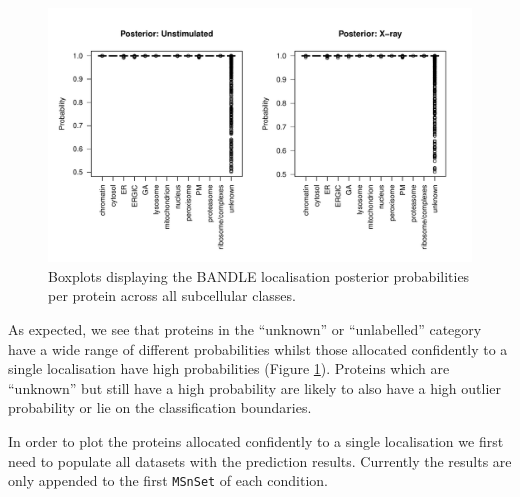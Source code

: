 \documentclass[9pt,a4paper,]{extarticle}
\begin{document}
\begin{figure}[H]

{\centering \includegraphics[width=0.9\linewidth,]{figs/bandle_posteriors} 

}

\caption{Boxplots displaying the BANDLE localisation posterior probabilities per protein across all subcellular classes.}\label{fig:bandle-posterior-boxplot}
\end{figure}

As expected, we see that proteins in the ``unknown'' or ``unlabelled'' category have
a wide range of different probabilities whilst those allocated confidently to a
single localisation have high probabilities (Figure \ref{fig:bandle-posterior-boxplot}). Proteins which are ``unknown'' but
still have a high probability are likely to also have a high outlier probability
or lie on the classification boundaries.

In order to plot the proteins allocated confidently to a single localisation we
first need to populate all datasets with the prediction results. Currently the
results are only appended to the first \texttt{MSnSet} of each condition.
\end{document}
